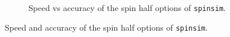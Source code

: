 \documentclass{jors}
\begin{document}
\begin{figure}[h!]
\begin{subfigure}[b]{0.475\textwidth}
					\caption{Speed vs accuracy of the spin half options of \texttt{spinsim}.}
					\label{fig:benchmark_spin_half_execution_error}
				\end{subfigure}
				\caption{Speed and accuracy of the spin half options of \texttt{spinsim}.}
				\label{fig:benchmark_spin_half}
			\end{figure}



\end{document}
